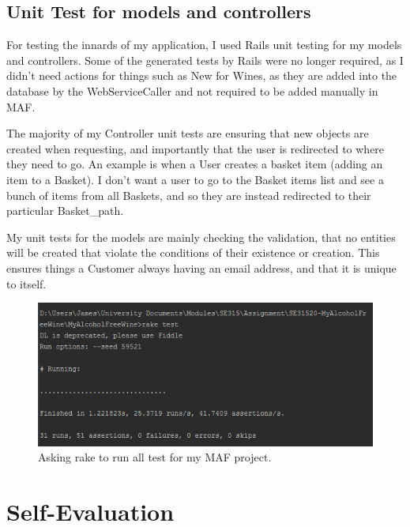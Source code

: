 \documentclass[12pt]{article}
\begin{document}
\subsection{Unit Test for models and controllers}
For testing the innards of my application, I used Rails unit testing for my models and controllers. Some of the generated tests by Rails were no longer required, as I didn't need actions for things such as New for Wines, as they are added into the database by the WebServiceCaller and not required to be added manually in MAF.

The majority of my Controller unit tests are ensuring that new objects are created when requesting, and importantly that the user is redirected to where they need to go. An example is when a User creates a basket item (adding an item to a Basket). I don't want a user to go to the Basket items list and see a bunch of items from all Baskets, and so they are instead redirected to their particular Basket\_path.

My unit tests for the models are mainly checking the validation, that no entities will be created that violate the conditions of their existence or creation. This ensures things a Customer always having an email address, and that it is unique to itself. 

\begin{figure}[H]
        \centering
                \includegraphics[width=1\textwidth]{assets/unit_test}
                \caption{Asking rake to run all test for my MAF project.}
                \label{fig: running tests.} 
\end{figure}


\section{Self-Evaluation}
\end{document}

